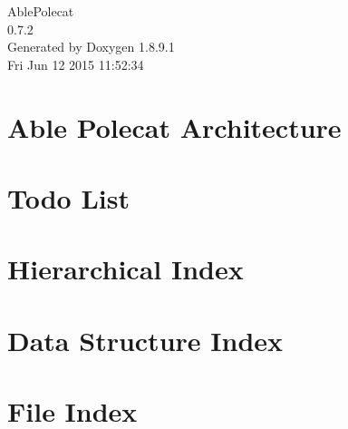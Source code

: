 \documentclass[twoside]{book}
\newcommand{\+}{\discretionary{\mbox{\scriptsize$\hookleftarrow$}}{}{}}
\newcommand{\clearemptydoublepage}{%
  \newpage{\pagestyle{empty}\cleardoublepage}%
}
\begin{document}
\hypersetup{pageanchor=false,
             bookmarks=true,
             bookmarksnumbered=true,
             pdfencoding=unicode
            }
\begin{titlepage}
\vspace*{7cm}
\begin{center}%
{\Large Able\+Polecat \\[1ex]\large 0.\+7.\+2 }\\
\vspace*{1cm}
{\large Generated by Doxygen 1.8.9.1}\\
\vspace*{0.5cm}
{\small Fri Jun 12 2015 11:52:34}\\
\end{center}
\end{titlepage}
\clearemptydoublepage
\tableofcontents
\clearemptydoublepage
{}
\hypersetup{pageanchor=true}

\chapter{Able Polecat Architecture}
\label{index}\hypertarget{index}{}
\chapter{Todo List}
\label{todo}
\hypertarget{todo}{}

\chapter{Hierarchical Index}

\chapter{Data Structure Index}

\chapter{File Index}

\end{document}
